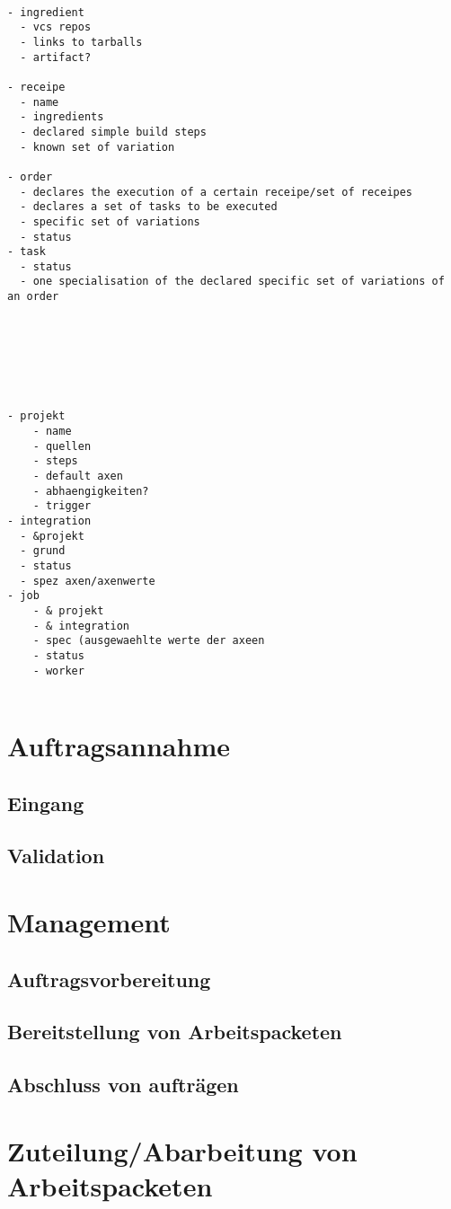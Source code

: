 \begin{verbatim}

- ingredient
  - vcs repos
  - links to tarballs
  - artifact?

- receipe
  - name
  - ingredients
  - declared simple build steps
  - known set of variation

- order
  - declares the execution of a certain receipe/set of receipes
  - declares a set of tasks to be executed
  - specific set of variations
  - status
- task
  - status
  - one specialisation of the declared specific set of variations of an order







- projekt
    - name
    - quellen
    - steps
    - default axen
    - abhaengigkeiten?
    - trigger
- integration
  - &projekt
  - grund
  - status
  - spez axen/axenwerte
- job
    - & projekt
    - & integration
    - spec (ausgewaehlte werte der axeen
    - status
    - worker


\end{verbatim}

\section{Auftragsannahme}
\subsection{Eingang}
\subsection{Validation}

\section{Management}
\subsection{Auftragsvorbereitung}
\subsection{Bereitstellung von Arbeitspacketen}
\subsection{Abschluss von auftr\"agen}


\section{Zuteilung/Abarbeitung von Arbeitspacketen}

